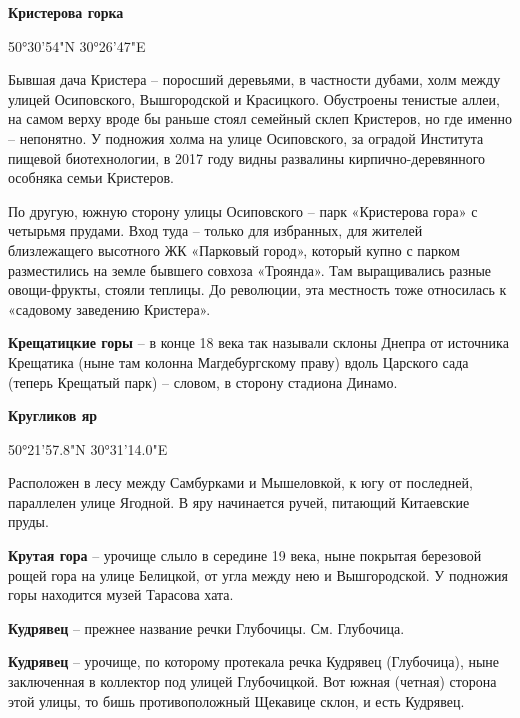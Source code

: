 \medskip

\textbf{Кристерова горка} 

50°30'54"N 30°26'47"E

Бывшая дача Кристера – поросший деревьями, в частности дубами, холм между улицей Осиповского, Вышгородской и Красицкого. Обустроены тенистые аллеи, на самом верху вроде бы раньше стоял семейный склеп Кристеров, но где именно – непонятно. У подножия холма на улице Осиповского, за оградой Института пищевой биотехнологии, в 2017 году видны развалины кирпично-деревянного особняка семьи Кристеров.

По другую, южную сторону улицы Осиповского – парк «Кристерова гора» с четырьмя прудами. Вход туда – только для избранных, для жителей близлежащего высотного ЖК «Парковый город», который купно с парком разместились на земле бывшего совхоза «Троянда». Там выращивались разные овощи-фрукты, стояли теплицы. До революции, эта местность тоже относилась к «садовому заведению Кристера».\\


\medskip

\textbf{Крещатицкие горы} – в конце 18 века так называли склоны Днепра от источника Крещатика (ныне там колонна Магдебургскому праву) вдоль Царского сада (теперь Крещатый парк) – словом, в сторону стадиона Динамо.\\

\medskip

\textbf{Кругликов яр} 

50°21'57.8"N 30°31'14.0"E

Расположен в лесу между Самбурками и Мышеловкой, к югу от последней, параллелен улице Ягодной. В яру начинается ручей, питающий Китаевские пруды.\\

\medskip

\textbf{Крутая гора} – урочище слыло в середине 19 века, ныне покрытая березовой рощей гора на улице Белицкой, от угла между нею и Вышгородской. У подножия горы находится музей Тарасова хата.\\

\medskip

\textbf{Кудрявец} – прежнее название речки Глубочицы. См. Глубочица.\\


\medskip

\textbf{Кудрявец} – урочище, по которому протекала речка Кудрявец (Глубочица), ныне заключенная в коллектор под улицей Глубочицкой. Вот южная (четная) сторона этой улицы, то бишь противоположный Щекавице склон, и есть Кудрявец.

